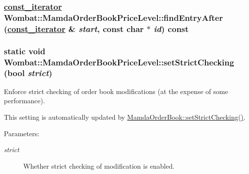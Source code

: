 \hypertarget{classWombat_1_1MamdaOrderBookPriceLevel_48a485bf88deda10e9696a870147ec23}{
\subsubsection[findEntryAfter]{\setlength{\rightskip}{0pt plus 5cm}\hyperlink{classWombat_1_1MamdaOrderBookPriceLevel_1_1iterator}{const\_\-iterator} Wombat::Mamda\-Order\-Book\-Price\-Level::find\-Entry\-After (\hyperlink{classWombat_1_1MamdaOrderBookPriceLevel_1_1iterator}{const\_\-iterator} \& {\em start}, const char $\ast$ {\em id}) const}}
\label{classWombat_1_1MamdaOrderBookPriceLevel_48a485bf88deda10e9696a870147ec23}


\hypertarget{classWombat_1_1MamdaOrderBookPriceLevel_e9aab3efc4718c4735251417e35ef167}{
\subsubsection[setStrictChecking]{\setlength{\rightskip}{0pt plus 5cm}static void Wombat::Mamda\-Order\-Book\-Price\-Level::set\-Strict\-Checking (bool {\em strict})}}
\label{classWombat_1_1MamdaOrderBookPriceLevel_e9aab3efc4718c4735251417e35ef167}


Enforce strict checking of order book modifications (at the expense of some performance). 

This setting is automatically updated by \hyperlink{classWombat_1_1MamdaOrderBook_469f47b99322ce6b9e002429a75a8efd}{Mamda\-Order\-Book::set\-Strict\-Checking()}.

\begin{Desc}
\item[Parameters:]
\begin{description}
\item[{\em strict}]Whether strict checking of modification is enabled. \end{description}
\end{Desc}


